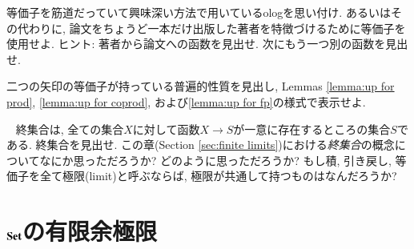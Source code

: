 \begin{exercise}
等価子を筋道だっていて興味深い方法で用いているologを思い付け. あるいはその代わりに, 論文をちょうど一本だけ出版した著者を特徴づけるために等価子を使用せよ. ヒント: 著者から論文への函数を見出せ. 次にもう一つ別の函数を見出せ.
\end{exercise}

\begin{exercise}
二つの矢印の等価子が持っている普遍的性質を見出し, Lemmas \ref{lemma:up for prod}, \ref{lemma:up for coprod}, および\ref{lemma:up for fp}の様式で表示せよ.
\end{exercise}

\begin{exercise}~
\sexc 終集合は, 全ての集合$X$に対して函数$X\to S$が一意に存在するところの集合$S$である. 終集合を見出せ.
\next この章(Section \ref{sec:finite limits})における\emph{終集合}の概念についてなにか思っただろうか? どのように思っただろうか? もし積, 引き戻し, 等価子を全て極限(limit)と呼ぶならば, 極限が共通して持つものはなんだろうか?
\endsexc
\end{exercise}



\section{${\bf Set}$の有限余極限}\label{sec:finite colimits}


